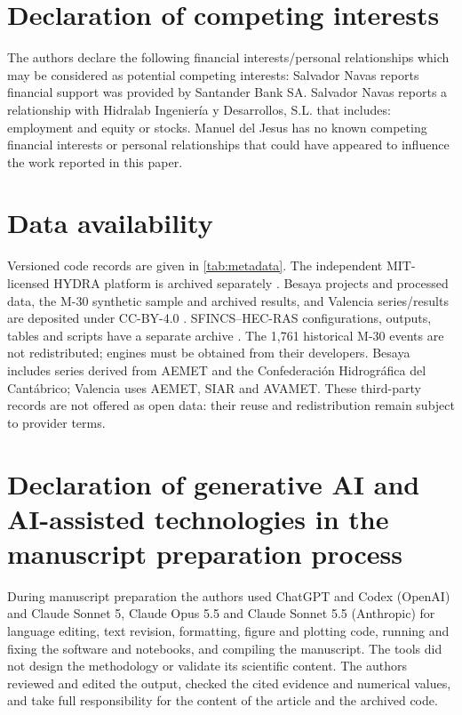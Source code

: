 \documentclass[preprint,12pt,a4paper]{elsarticle}
\begin{document}
\par\medskip
\begin{minipage}{\linewidth}
\section*{Declaration of competing interests}
The authors declare the following financial interests/personal relationships
which may be considered as potential competing interests: Salvador Navas
reports financial support was provided by Santander Bank SA. Salvador Navas
reports a relationship with Hidralab Ingeniería y Desarrollos, S.L. that
includes: employment and equity or stocks. Manuel del Jesus has no known
competing financial interests or personal relationships that could have
appeared to influence the work reported in this paper.

\end{minipage}

\section*{Data availability}
Versioned code records are given in \cref{tab:metadata}.
The independent MIT-licensed HYDRA platform is archived separately
\citep{navas2026hydrarepo}. Besaya projects and processed data, the M-30
synthetic sample and archived results, and Valencia series/results are
deposited under CC-BY-4.0 \citep{navas2026pilotdata}.
SFINCS--HEC-RAS configurations, outputs, tables and scripts have a separate
archive \citep{navas2026besayadata}. The 1{,}761 historical M-30 events are
not redistributed; engines must be obtained from their developers.
Besaya includes series derived from AEMET and the Confederaci{\'o}n
Hidrogr{\'a}fica del Cant{\'a}brico; Valencia uses AEMET, SIAR and AVAMET. These third-party records are not offered as open data: their
reuse and redistribution remain subject to provider terms.

\section*{Declaration of generative AI and AI-assisted technologies in the
manuscript preparation process}
During manuscript preparation the authors used ChatGPT and Codex (OpenAI) and
Claude Sonnet 5, Claude Opus 5.5 and Claude Sonnet 5.5 (Anthropic) for language
editing, text revision, formatting, figure and plotting code, running and fixing
the software and notebooks, and compiling the manuscript. The tools did not design
the methodology or validate its scientific content. The authors reviewed and
edited the output, checked the cited evidence and numerical values, and take
full responsibility for the content of the article and the archived code.
\end{document}
